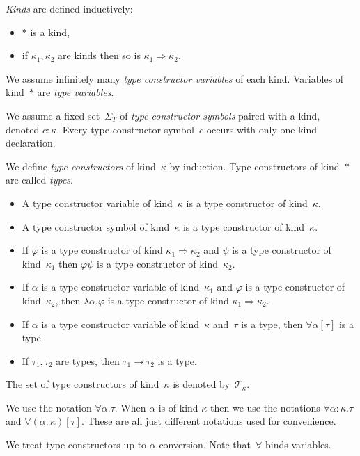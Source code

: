 \documentclass[runningheads,a4paper]{llncs}
\newcommand{\arrtype}{\rightarrow}
\newcommand{\arrkind}{\Rightarrow}
\newcommand{\Tc}{\mathcal{T}}
\begin{document}
\begin{definition}\label{def_types}\normalfont
  \emph{Kinds} are defined inductively:
  \begin{itemize}
  \item $*$ is a kind,
  \item if $\kappa_1,\kappa_2$ are kinds then so is $\kappa_1 \arrkind
    \kappa_2$.
  \end{itemize}

  We assume infinitely many \emph{type constructor variables} of each
  kind. Variables of kind~$*$ are \emph{type variables}.

  We assume a fixed set~$\Sigma_T$ of \emph{type constructor symbols}
  paired with a kind, denoted $c : \kappa$. Every type constructor
  symbol~$c$ occurs with only one kind declaration.

  We define \emph{type constructors} of kind~$\kappa$ by induction.
  Type constructors of kind~$*$ are called \emph{types}.
  \begin{itemize}
  \item A type constructor variable of kind~$\kappa$ is a type
    constructor of kind~$\kappa$.
  \item A type constructor symbol of kind~$\kappa$ is a type
    constructor of kind~$\kappa$.
  \item If $\varphi$ is a type constructor of kind $\kappa_1 \arrkind
    \kappa_2$ and $\psi$ is a type constructor of kind~$\kappa_1$ then
    $\varphi \psi$ is a type constructor of kind~$\kappa_2$.
  \item If $\alpha$ is a type constructor variable of kind~$\kappa_1$
    and $\varphi$ is a type constructor of kind~$\kappa_2$, then
    $\lambda\alpha . \varphi$ is a type constructor of kind $\kappa_1
    \arrkind \kappa_2$.
  \item If $\alpha$ is a type constructor variable of kind~$\kappa$
    and~$\tau$ is a type, then $\forall \alpha[\tau]$ is a type.
  \item If $\tau_1,\tau_2$ are types, then $\tau_1 \arrtype \tau_2$ is
    a type.
  \end{itemize}
  The set of type constructors of kind~$\kappa$ is denoted
  by~$\Tc_\kappa$.

  We use the notation $\forall \alpha . \tau$. When $\alpha$ is of
  kind $\kappa$ then we use the notations
  $\forall \alpha : \kappa . \tau$ and
  $\forall (\alpha : \kappa)[\tau]$. These are all just different
  notations used for convenience.

  We treat type constructors up to $\alpha$-conversion. Note
  that~$\forall$ binds variables.


\end{definition}
\end{document}
